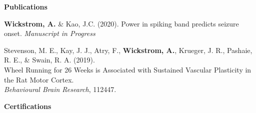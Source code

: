 \documentclass[10pt, oneside]{article}
\begin{document}


{\Large \textbf{Publications}} \hrulefill

\textbf{Wickstrom, A.} \& Kao, J.C. (2020).  Power in spiking band predicts seizure onset. \textit{Manuscript in Progress}

Stevenson, M. E., Kay, J. J., Atry, F., \textbf{Wickstrom, A.}, Krueger, J. R., Pashaie, R. E., \& Swain, R. A. (2019).\\ Wheel Running for 26 Weeks is Associated with Sustained Vascular Plasticity in the Rat Motor Cortex. \\ \textit{Behavioural Brain Research}, 112447.

\begin{comment}
\textbf{Wickstrom, A.}, Lyttle, D. \& Diba, K. (2020). Forward and reverse replay in a recurrent network with STDP. (2020).\\
\end{comment}
\begin{comment}


{\Large \textbf{Memberships}} \hrulefill %

 \textbf{Institute of Electrical and Electronics Engineers} \hfill{Jan. 2016 --- Present}\newline
	 \phantom{9mm} Engineering in Medicine and Biology Society 

	 \textbf{Society for Neuroscience} \hfill{Oct. 2015 --- Present} \newline
	 \phantom{9mm} Biochemical Technology Division
	 
	 \textbf{American Medical Student Association}  (UWM chapter) \hfill{Jan. 2012 --- Dec. 2015} \newline
	 \phantom{9mm}Volunteer Coordinator \hfill{Jan. 2013 --- June 2014} \newline
	 \phantom{9mm}Chair of Race, Ethnicity, and Culture in Health \hfill{Jan. --- June 2014}  
\end{comment}
{\Large \textbf{Certifications}} \hrulefill
\end{document}
